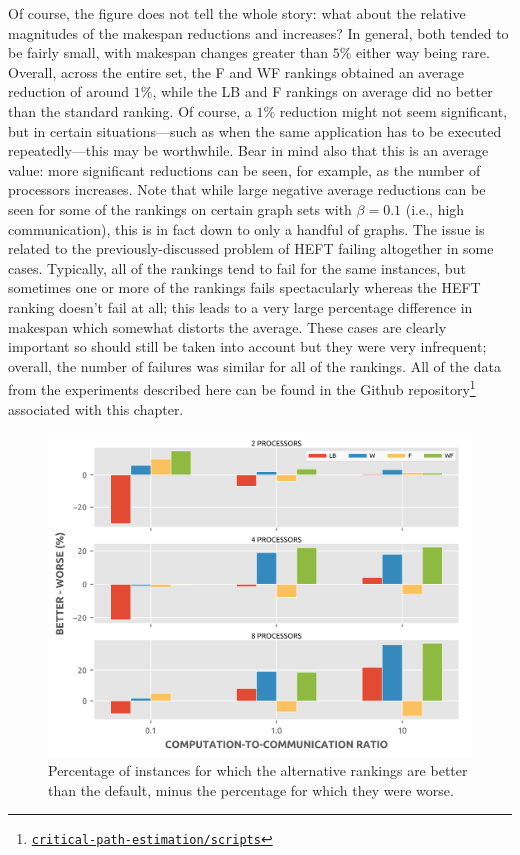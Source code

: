 \documentclass[12pt]{article}
\begin{document}
Of course, the figure does not tell the whole story: what about the relative magnitudes of the makespan reductions and increases? In general, both tended to be fairly small, with makespan changes greater than $5\%$ either way being rare. Overall, across the entire set, the F and WF rankings obtained an average reduction of around $1\%$, while the LB and F rankings on average did no better than the standard ranking. Of course, a $1\%$ reduction might not seem significant, but in certain situations---such as when the same application has to be executed repeatedly---this may be worthwhile. Bear in mind also that this is an average value: more significant reductions can be seen, for example, as the number of processors increases. Note that while large negative average reductions can be seen for some of the rankings on certain graph sets with $\beta = 0.1$ (i.e., high communication), this is in fact down to only a handful of graphs. The issue is related to the previously-discussed problem of HEFT failing altogether in some cases. Typically, all of the rankings tend to fail for the same instances, but sometimes one or more of the rankings fails spectacularly whereas the HEFT ranking doesn't fail at all; this leads to a very large percentage difference in makespan which somewhat distorts the average. These cases are clearly important so should still be taken into account but they were very infrequent; overall, the number of failures was similar for all of the rankings. All of the data from the experiments described here can be found in the Github repository\footnote{\href{https://github.com/mcsweeney90/critical-path-estimation}{{\tt \small critical-path-estimation/scripts}}} associated with this chapter.    

\begin{figure}
	\centering	
	\includegraphics[scale=0.8]{100tasks_differential.png}
	\caption{Percentage of instances for which the alternative rankings are better than the default, minus the percentage for which they were worse.}	
	\label{plot.rankings_diff_100}
\end{figure}
\end{document}
